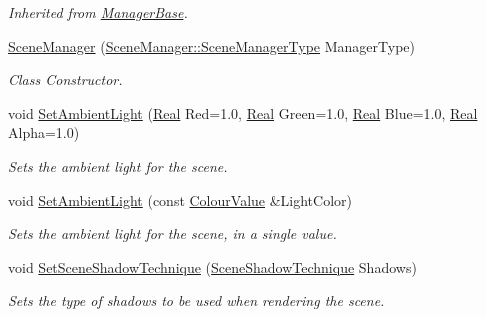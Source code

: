 \begin{DoxyCompactItemize}
\begin{DoxyCompactList}\small\item\em Inherited from \hyperlink{classMezzanine_1_1ManagerBase}{ManagerBase}. \item\end{DoxyCompactList}\item 
\hyperlink{classMezzanine_1_1SceneManager_a5f26c1c9b6714b48ad486e289eca16d0}{SceneManager} (\hyperlink{classMezzanine_1_1SceneManager_ad6e20c08b97a230314abda3e5826f274}{SceneManager::SceneManagerType} ManagerType)
\begin{DoxyCompactList}\small\item\em Class Constructor. \item\end{DoxyCompactList}\item 
void \hyperlink{classMezzanine_1_1SceneManager_ae4b889a919e490edcc3a7d0c32135a82}{SetAmbientLight} (\hyperlink{namespaceMezzanine_a726731b1a7df72bf3583e4a97282c6f6}{Real} Red=1.0, \hyperlink{namespaceMezzanine_a726731b1a7df72bf3583e4a97282c6f6}{Real} Green=1.0, \hyperlink{namespaceMezzanine_a726731b1a7df72bf3583e4a97282c6f6}{Real} Blue=1.0, \hyperlink{namespaceMezzanine_a726731b1a7df72bf3583e4a97282c6f6}{Real} Alpha=1.0)
\begin{DoxyCompactList}\small\item\em Sets the ambient light for the scene. \item\end{DoxyCompactList}\item 
void \hyperlink{classMezzanine_1_1SceneManager_a887c8fb632f4e64b5aec59900ec545aa}{SetAmbientLight} (const \hyperlink{classMezzanine_1_1ColourValue}{ColourValue} \&LightColor)
\begin{DoxyCompactList}\small\item\em Sets the ambient light for the scene, in a single value. \item\end{DoxyCompactList}\item 
void \hyperlink{classMezzanine_1_1SceneManager_ae487633b59779be0bd63de98c4656f6d}{SetSceneShadowTechnique} (\hyperlink{classMezzanine_1_1SceneManager_a8149cd1ec188e0d57935d71c6a7134c6}{SceneShadowTechnique} Shadows)
\begin{DoxyCompactList}\small\item\em Sets the type of shadows to be used when rendering the scene. \item\end{DoxyCompactList}\item 

\end{DoxyCompactItemize}
